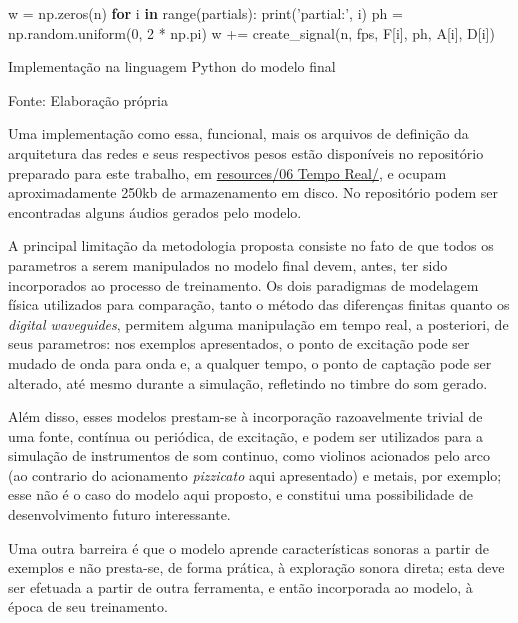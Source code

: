 \documentclass[]{article}
\newenvironment{Shaded}{}{}
\newcommand{\BuiltInTok}[1]{#1}
\newcommand{\ControlFlowTok}[1]{\textcolor[rgb]{0.00,0.44,0.13}{\textbf{#1}}}
\newcommand{\DecValTok}[1]{\textcolor[rgb]{0.25,0.63,0.44}{#1}}
\newcommand{\KeywordTok}[1]{\textcolor[rgb]{0.00,0.44,0.13}{\textbf{#1}}}
\newcommand{\NormalTok}[1]{#1}
\newcommand{\OperatorTok}[1]{\textcolor[rgb]{0.40,0.40,0.40}{#1}}
\newcommand{\StringTok}[1]{\textcolor[rgb]{0.25,0.44,0.63}{#1}}
\begin{document}
\begin{Shaded}
\begin{Highlighting}[numbers=left,,]
\NormalTok{w }\OperatorTok{=}\NormalTok{ np.zeros(n)}
\ControlFlowTok{for}\NormalTok{ i }\KeywordTok{in} \BuiltInTok{range}\NormalTok{(partials):}
  \BuiltInTok{print}\NormalTok{(}\StringTok{'partial:'}\NormalTok{, i)}
\NormalTok{  ph }\OperatorTok{=}\NormalTok{ np.random.uniform(}\DecValTok{0}\NormalTok{, }\DecValTok{2} \OperatorTok{*}\NormalTok{ np.pi)}
\NormalTok{  w }\OperatorTok{+=}\NormalTok{ create_signal(n, fps, F[i], ph, A[i], D[i])}
\end{Highlighting}
\end{Shaded}

Implementação na linguagem Python do modelo final

Fonte: Elaboração própria

Uma implementação como essa, funcional, mais os arquivos de definição da
arquitetura das redes e seus respectivos pesos estão disponíveis no
repositório preparado para este trabalho, em
\href{https://github.com/tesserato/tesserato.github.io/tree/master/resources/06\%20Tempo\%20Real}{resources/06
Tempo Real/}, e ocupam aproximadamente 250kb de armazenamento em disco.
No repositório podem ser encontradas alguns áudios gerados pelo modelo.

A principal limitação da metodologia proposta consiste no fato de que
todos os parametros a serem manipulados no modelo final devem, antes,
ter sido incorporados ao processo de treinamento. Os dois paradigmas de
modelagem física utilizados para comparação, tanto o método das
diferenças finitas quanto os \emph{digital waveguides}, permitem alguma
manipulação em tempo real, a posteriori, de seus parametros: nos
exemplos apresentados, o ponto de excitação pode ser mudado de onda para
onda e, a qualquer tempo, o ponto de captação pode ser alterado, até
mesmo durante a simulação, refletindo no timbre do som gerado.

Além disso, esses modelos prestam-se à incorporação razoavelmente
trivial de uma fonte, contínua ou periódica, de excitação, e podem ser
utilizados para a simulação de instrumentos de som continuo, como
violinos acionados pelo arco (ao contrario do acionamento
\emph{pizzicato} aqui apresentado) e metais, por exemplo; esse não é o
caso do modelo aqui proposto, e constitui uma possibilidade de
desenvolvimento futuro interessante.

Uma outra barreira é que o modelo aprende características sonoras a
partir de exemplos e não presta-se, de forma prática, à exploração
sonora direta; esta deve ser efetuada a partir de outra ferramenta, e
então incorporada ao modelo, à época de seu treinamento.
\end{document}
